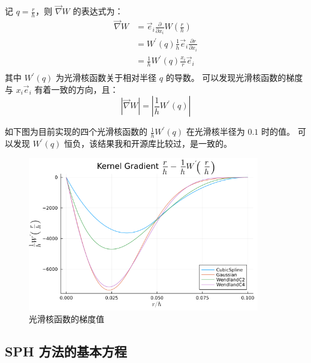 \begin{frame}
    记 $q=\frac{r}{h}$，则 $\vec{\nabla} W$ 的表达式为：
    \begin{equation}
        \begin{aligned}
            \vec{\nabla} W 
            &= \vec{e}_i\frac{\partial}{\partial x_i}W\left(\frac{r}{h}\right)\\
            &= W^\prime(q)\frac{1}{h}\vec{e}_i\frac{\partial r}{\partial x_i}\\
            &= \frac{1}{h}W^\prime(q) \frac{x_i}{r}\vec{e}_i\\
        \end{aligned}
    \end{equation}
    其中 $W^\prime(q)$ 为光滑核函数关于相对半径 $q$ 的导数。
    可以发现光滑核函数的梯度与 $x_i\vec{e}_i$ 有着一致的方向，且：
    \begin{equation}
        |\vec{\nabla}W| = \left|\frac{1}{h}W^\prime(q)\right|
    \end{equation}
\end{frame}

\begin{frame}
    如下图为目前实现的四个光滑核函数的 $\frac{1}{h}W^\prime(q)$ 在光滑核半径为 $0.1$ 时的值。
    可以发现 $W^\prime(q)$ 恒负，该结果我和开源库比较过，是一致的。
    \begin{figure}[H]
        \centering
        \includegraphics[width=0.9\textwidth]{images/kernel_gradient.png}
        \caption{光滑核函数的梯度值}
    \end{figure}
\end{frame}

\subsection{SPH 方法的基本方程}

